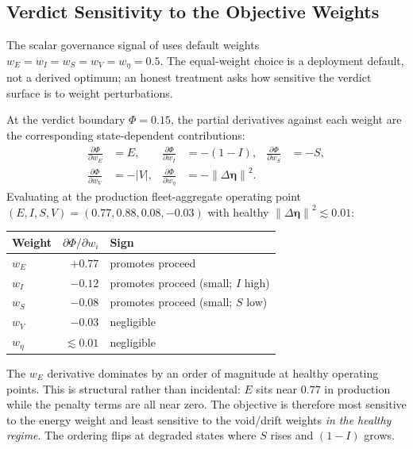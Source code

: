 \documentclass[11pt,twocolumn]{article}
\newcommand{\norm}[1]{\left\lVert #1 \right\rVert}
\newcommand{\abs}[1]{\left| #1 \right|}
\newcommand{\deta}{\ensuremath{\Delta\bm{\eta}}}
\begin{document}
\subsection{Verdict Sensitivity to the Objective Weights}
\label{sec:phi-sensitivity}

The scalar governance signal of  uses default weights
$w_E = w_I = w_S = w_V = w_\eta = 0.5$. The equal-weight choice is
a deployment default, not a derived optimum; an honest treatment
asks how sensitive the verdict surface is to weight perturbations.

At the verdict boundary $\Phi = 0.15$, the partial derivatives
against each weight are the corresponding state-dependent
contributions:
\begin{align*}
  \frac{\partial \Phi}{\partial w_E} &= E,
  & \frac{\partial \Phi}{\partial w_I} &= -(1-I),
  & \frac{\partial \Phi}{\partial w_S} &= -S, \\
  \frac{\partial \Phi}{\partial w_V} &= -\abs{V},
  & \frac{\partial \Phi}{\partial w_\eta} &= -\norm{\deta}^2.
\end{align*}
Evaluating at the production fleet-aggregate operating point
$(E, I, S, V) = (0.77, 0.88, 0.08, -0.03)$ with healthy
$\norm{\deta}^2 \lesssim 0.01$:
\begin{center}
\small
\setlength{\tabcolsep}{3pt}
\begin{tabular}{@{}lrl@{}}
\toprule
\textbf{Weight} & $\partial\Phi/\partial w_i$ & \textbf{Sign} \\
\midrule
$w_E$ & $+0.77$ & promotes proceed \\
$w_I$ & $-0.12$ & promotes proceed (small; $I$ high) \\
$w_S$ & $-0.08$ & promotes proceed (small; $S$ low) \\
$w_V$ & $-0.03$ & negligible \\
$w_\eta$ & $\lesssim 0.01$ & negligible \\
\bottomrule
\end{tabular}
\end{center}
The $w_E$ derivative dominates by an order of magnitude at healthy
operating points. This is structural rather than incidental: $E$
sits near $0.77$ in production while the penalty terms are all
near zero. The objective is therefore most sensitive to the
energy weight and least sensitive to the void/drift weights
\emph{in the healthy regime}. The ordering flips at degraded
states where $S$ rises and $(1-I)$ grows.
\end{document}
